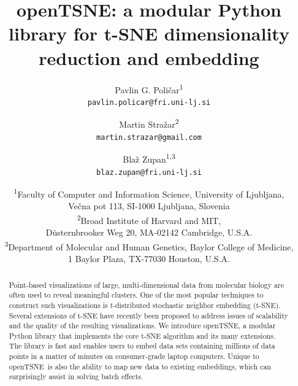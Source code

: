 \documentclass[letter]{article}
\newcommand{\opentsne}{\textsf{openTSNE}}
\begin{document}
\title{openTSNE: a modular Python library for t-SNE dimensionality reduction and embedding}

\author{
  Pavlin G. Poli\v{c}ar\textsuperscript{1}\\
  \texttt{pavlin.policar@fri.uni-lj.si}\\
  \and
  Martin Stra\v{zar}\textsuperscript{2}\\
  \texttt{martin.strazar@gmail.com}\\
  \and
  Bla\v{z} Zupan\textsuperscript{1,3}\\
  \texttt{blaz.zupan@fri.uni-lj.si}\\
}

\date{
  \textsuperscript{1}Faculty of Computer and Information Science, University of Ljubljana,\\
  Ve\v{c}na pot 113, SI-1000 Ljubljana, Slovenia\\ \vspace{2mm}
  \textsuperscript{2}Broad Institute of Harvard and MIT,\\
  D\"{u}sternbrooker Weg 20, MA-02142 Cambridge, U.S.A.\\ \vspace{2mm}
  \textsuperscript{3}Department of Molecular and Human Genetics, Baylor College of Medicine,\\
  1 Baylor Plaza, TX-77030 Houston, U.S.A.
}

\maketitle

\begin{abstract}
Point-based visualizations of large, multi-dimensional data from molecular
biology are often used to reveal meaningful clusters. One of the most popular
techniques to construct such visualizations is $t$-distributed stochastic
neighbor embedding (t-SNE). Several extensions of t-SNE have
recently been proposed to address issues of scalability and the quality
of the resulting visualizations. We introduce \opentsne, a modular
Python library that implements the core t-SNE algorithm and its many
extensions.
The library is fast and enables users to embed data sets containing millions of
data points in a matter of minutes on consumer-grade laptop computers.
Unique to \opentsne\ is also the ability to map new data to existing embeddings,
which can surprisingly assist in solving batch effects.
\end{abstract}
\end{document}
